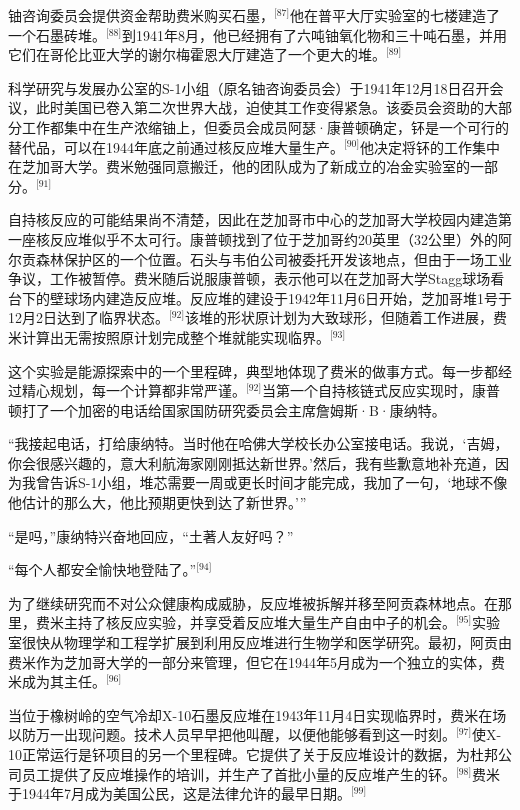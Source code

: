 铀咨询委员会提供资金帮助费米购买石墨，\(^\text{[87]}\)他在普平大厅实验室的七楼建造了一个石墨砖堆。\(^\text{[88]}\)到1941年8月，他已经拥有了六吨铀氧化物和三十吨石墨，并用它们在哥伦比亚大学的谢尔梅霍恩大厅建造了一个更大的堆。\(^\text{[89]}\)

科学研究与发展办公室的S-1小组（原名铀咨询委员会）于1941年12月18日召开会议，此时美国已卷入第二次世界大战，迫使其工作变得紧急。该委员会资助的大部分工作都集中在生产浓缩铀上，但委员会成员阿瑟·康普顿确定，钚是一个可行的替代品，可以在1944年底之前通过核反应堆大量生产。\(^\text{[90]}\)他决定将钚的工作集中在芝加哥大学。费米勉强同意搬迁，他的团队成为了新成立的冶金实验室的一部分。\(^\text{[91]}\)

自持核反应的可能结果尚不清楚，因此在芝加哥市中心的芝加哥大学校园内建造第一座核反应堆似乎不太可行。康普顿找到了位于芝加哥约20英里（32公里）外的阿尔贡森林保护区的一个位置。石头与韦伯公司被委托开发该地点，但由于一场工业争议，工作被暂停。费米随后说服康普顿，表示他可以在芝加哥大学Stagg球场看台下的壁球场内建造反应堆。反应堆的建设于1942年11月6日开始，芝加哥堆1号于12月2日达到了临界状态。\(^\text{[92]}\)该堆的形状原计划为大致球形，但随着工作进展，费米计算出无需按照原计划完成整个堆就能实现临界。\(^\text{[93]}\)

这个实验是能源探索中的一个里程碑，典型地体现了费米的做事方式。每一步都经过精心规划，每一个计算都非常严谨。\(^\text{[92]}\)当第一个自持核链式反应实现时，康普顿打了一个加密的电话给国家国防研究委员会主席詹姆斯·B·康纳特。

“我接起电话，打给康纳特。当时他在哈佛大学校长办公室接电话。我说，‘吉姆，你会很感兴趣的，意大利航海家刚刚抵达新世界。’然后，我有些歉意地补充道，因为我曾告诉S-1小组，堆芯需要一周或更长时间才能完成，我加了一句，‘地球不像他估计的那么大，他比预期更快到达了新世界。’”

“是吗，”康纳特兴奋地回应，“土著人友好吗？”

“每个人都安全愉快地登陆了。”\(^\text{[94]}\)

为了继续研究而不对公众健康构成威胁，反应堆被拆解并移至阿贡森林地点。在那里，费米主持了核反应实验，并享受着反应堆大量生产自由中子的机会。\(^\text{[95]}\)实验室很快从物理学和工程学扩展到利用反应堆进行生物学和医学研究。最初，阿贡由费米作为芝加哥大学的一部分来管理，但它在1944年5月成为一个独立的实体，费米成为其主任。\(^\text{[96]}\)

当位于橡树岭的空气冷却X-10石墨反应堆在1943年11月4日实现临界时，费米在场以防万一出现问题。技术人员早早把他叫醒，以便他能够看到这一时刻。\(^\text{[97]}\)使X-10正常运行是钚项目的另一个里程碑。它提供了关于反应堆设计的数据，为杜邦公司员工提供了反应堆操作的培训，并生产了首批小量的反应堆产生的钚。\(^\text{[98]}\)费米于1944年7月成为美国公民，这是法律允许的最早日期。\(^\text{[99]}\)

